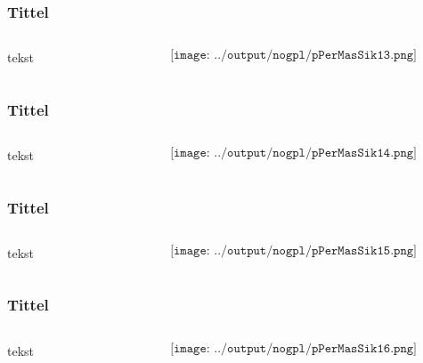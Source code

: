 \documentclass[aspectratio=169,xcolor=dvipsnames]{beamer}
\begin{document}
\begin{frame}
	\frametitle{Tittel}
	\begin{columns}
		\begin{column}{0.5\textwidth}
tekst
			
		\end{column}

		\begin{column}{0.5\textwidth}
	$$\texttt{[image: ../output/nogpl/pPerMasSik13.png]}$$
		\end{column}
	\end{columns}
\end{frame}

\begin{frame}
	\frametitle{Tittel}
	\begin{columns}
		\begin{column}{0.5\textwidth}
tekst
			
		\end{column}

		\begin{column}{0.5\textwidth}
	$$\texttt{[image: ../output/nogpl/pPerMasSik14.png]}$$
		\end{column}
	\end{columns}
\end{frame}

\begin{frame}
	\frametitle{Tittel}
	\begin{columns}
		\begin{column}{0.5\textwidth}
tekst
			
		\end{column}

		\begin{column}{0.5\textwidth}
	$$\texttt{[image: ../output/nogpl/pPerMasSik15.png]}$$
		\end{column}
	\end{columns}
\end{frame}

\begin{frame}
	\frametitle{Tittel}
	\begin{columns}
		\begin{column}{0.5\textwidth}
tekst
			
		\end{column}

		\begin{column}{0.5\textwidth}
	$$\texttt{[image: ../output/nogpl/pPerMasSik16.png]}$$
		\end{column}
	\end{columns}
\end{frame}
\end{document}
